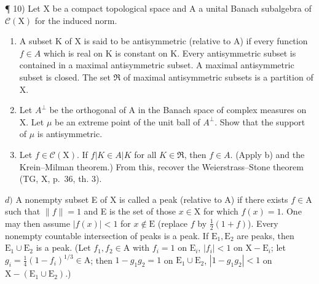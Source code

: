 ¶ 10) Let X be a compact topological space and A a unital Banach subalgebra of \(\mathcal{C}(\mathrm{X})\) for the induced norm.

\begin{enumerate}
\def\labelenumi{\alph{enumi})}
\item
  A subset K of X is said to be antisymmetric (relative to A) if every function \(f \in A\) which is real on K is constant on K. Every antisymmetric subset is contained in a maximal antisymmetric subset. A maximal antisymmetric subset is closed. The set \(\mathfrak{R}\) of maximal antisymmetric subsets is a partition of X.
\item
  Let \(A^{\perp}\) be the orthogonal of A in the Banach space of complex measures on X. Let \(\mu\) be an extreme point of the unit ball of \(A^{\perp}\). Show that the support of \(\mu\) is antisymmetric.
\item
  Let \(f \in \mathcal{C}(\mathrm{X})\). If \(f|K \in A|K\) for all \(K \in \mathfrak{R}\), then \(f \in A\). (Apply b) and the Krein–Milman theorem.) From this, recover the Weierstrass–Stone theorem (TG, X, p.~36, th. 3).
\end{enumerate}

\(d)\) A nonempty subset E of X is called a peak (relative to A) if there exists \(f\in \mathrm{A}\) such that \(\| f\| = 1\) and E is the set of those \(x\in \mathrm{X}\) for which \(f(x) = 1\). One may then assume \(|f(x)| < 1\) for \(x\notin \mathrm{E}\) (replace \(f\) by \(\frac{1}{2} (1 + f)\)). Every nonempty countable intersection of peaks is a peak. If \(\mathrm{E}_1,\mathrm{E}_2\) are peaks, then \(\mathrm{E}_1\cup \mathrm{E}_2\) is a peak. (Let \(f_{1},f_{2}\in \mathrm{A}\) with \(f_{i} = 1\) on \(\mathrm{E}_i\), \(|f_i| < 1\) on \(\mathrm{X - E}_i\); let \(g_{i} = \frac{1}{4} (1 - f_{i})^{1 / 3}\in \mathrm{A}\); then \(1 - g_{1}g_{2} = 1\) on \(\mathrm{E}_1\cup \mathrm{E}_2\), \(|1 - g_1g_2| < 1\) on \(\mathrm{X - (E_1\cup E_2)}\).)

